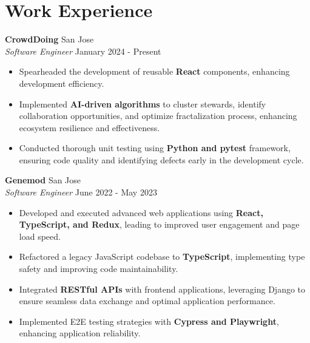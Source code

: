 \documentclass[a4paper,10pt]{article}
\begin{document}
\section*{Work Experience}\vspace{0.5mm}
\noindent \textbf{CrowdDoing} \hfill {San Jose}\\
\vspace{0.5mm}
\textit{Software Engineer} \hfill {January 2024 - Present}\vspace{-\baselineskip}
\vspace{2.5mm}
\begin{itemize}
    \item Spearheaded the development of reusable \textbf{React} components, enhancing development efficiency.\vspace{0.3ex}
    \item Implemented \textbf{AI-driven algorithms} to cluster stewards, identify collaboration opportunities, and optimize fractalization process, enhancing ecosystem resilience and effectiveness.\vspace{0.3ex}
    \item Conducted thorough unit testing using \textbf{Python and pytest} framework, ensuring code quality and identifying defects early in the development cycle.\vspace{0.3ex}
\end{itemize}

\vspace{3mm}

\noindent \textbf{Genemod} \hfill {San Jose}\\
\textit{Software Engineer} \hfill {June 2022 - May 2023}\vspace{-\baselineskip}
\vspace{2.5mm}
\begin{itemize}
    \item Developed and executed advanced web applications using \textbf{React, TypeScript, and Redux}, leading to improved user engagement and page load speed.\vspace{0.3ex}
    \item Refactored a legacy JavaScript codebase to \textbf{TypeScript}, implementing type safety and improving code maintainability.\vspace{0.3ex}
    \item Integrated \textbf{RESTful APIs} with frontend applications, leveraging Django to ensure seamless data exchange and optimal application performance.\vspace{0.3ex}
    \item Implemented E2E testing strategies with \textbf{Cypress and Playwright}, enhancing application reliability.\vspace{0.3ex}
\end{itemize}
\end{document}
